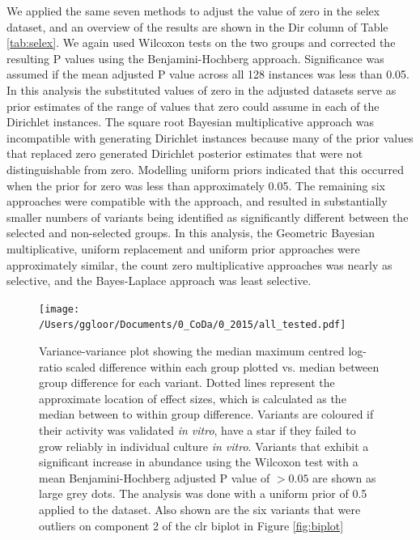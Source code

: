 \documentclass[article]{ajs}\usepackage[]{graphicx}\usepackage[]{color}
\begin{document}
We applied the same seven methods to adjust the value of zero in the selex dataset, and an overview of the results are shown in the Dir column of Table \ref{tab:selex}. We again used Wilcoxon tests on the two groups and corrected the resulting P values using the Benjamini-Hochberg approach. Significance was assumed if the mean adjusted P value across all 128 instances was less than 0.05.  In this analysis the substituted values of zero in the adjusted datasets serve as prior estimates of the range of values that zero could assume in each of the Dirichlet instances.  The square root Bayesian multiplicative approach was incompatible with generating Dirichlet instances because many of the prior values that replaced zero generated Dirichlet posterior estimates that were not distinguishable from zero. Modelling uniform priors indicated that this occurred when the prior for zero was less than approximately 0.05. The remaining six approaches were compatible with the approach, and resulted in substantially smaller numbers of variants being identified as significantly different between the selected and non-selected groups. In this analysis, the Geometric Bayesian multiplicative, uniform replacement and uniform prior approaches were approximately similar, the count zero multiplicative  approaches was nearly as selective, and the Bayes-Laplace approach was least selective. 

\begin{figure}[!ht]
\centerline{\texttt{[image: /Users/ggloor/Documents/0\_CoDa/0\_2015/all\_tested.pdf]}}
\vspace{3mm} \caption{Variance-variance plot showing the median maximum centred log-ratio scaled difference within each group plotted vs. median between group difference for each variant. Dotted lines represent the approximate location of effect sizes, which is calculated as the median between to within group difference. Variants are coloured if their activity was validated \emph{in vitro}, have a star if they failed to grow reliably in individual culture \emph{in vitro}. Variants that exhibit a significant increase in abundance using the Wilcoxon test with a mean Benjamini-Hochberg adjusted P value of $> 0.05$ are shown as large grey dots. The analysis was done with a uniform prior of 0.5 applied to the dataset. Also shown are the six variants that were outliers on component 2 of the clr biplot in Figure \ref{fig:biplot}}
\label{fig:vv}
\end{figure}
\end{document}
